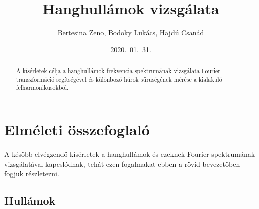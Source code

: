 \documentclass[a4paper,12pt]{article}
\title{\bf Hanghullámok vizsgálata}
\author{ {Bertesina Zeno}, {Bodoky Lukács}, {Hajdú Csanád}}
\date{2020.\ 01.\ 31.}
\begin{document}
\maketitle
\thispagestyle{empty}

\begin{abstract}
A kísérletek célja a hanghullámok frekvencia spektrumának vizsgálata Fourier transzformáció segítségével és különböző húrok sűrűségének mérése a kialakuló felharmonikusokból.
\end{abstract}

\section{Elméleti összefoglaló}

A később elvégzendő kísérletek a hanghullámok és ezeknek Fourier spektrumának vizsgálatával kapcslódnak, tehát ezen fogalmakat ebben a rövid bevezetőben fogjuk részletezni. 

\subsection{Hullámok}
\end{document}
